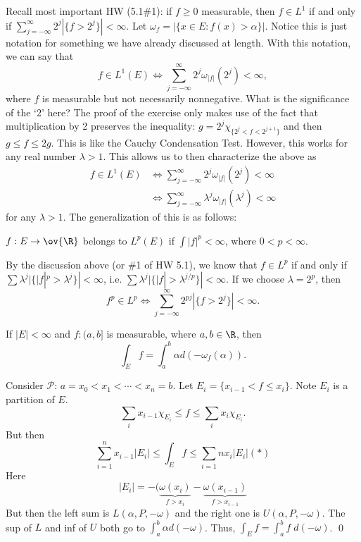 Recall most important HW (5.1\#1): if $f \geq 0$ measurable, then $f \in L^1$ if and only if $\sum_{j= -\infty}^\infty 2^j |\{ f>2^j\}| < \infty$.  Let $\omega_f= |\{ x \in E \colon f(x)>\alpha\}|$. Notice this is just notation for something we have already discussed at length. With this notation, we can say that
	\[
	f \in L^1(E) \Longleftrightarrow \sum_{j= -\infty}^\infty 2^j \omega_{|f|}(2^j)< \infty,
	\]
where $f$ is measurable but not necessarily nonnegative. What is the significance of the `2' here? The proof of the exercise only makes use of the fact that multiplication by 2 preserves the inequality: $g= 2^j \chi_{\{2^j<f<2^{j+1}\}}$ and then $g \leq f \leq 2g$. This is like the Cauchy Condensation Test. However, this works for any real number $\lambda>1$. This allows us to then characterize the above as 
	\[
	\begin{split}
	f \in L^1(E) &\Longleftrightarrow \sum_{j= -\infty}^\infty 2^j \omega_{|f|}(2^j)< \infty \\
	&\Longleftrightarrow \sum_{j= -\infty}^\infty \lambda^j \omega_{|f|}(\lambda^j)< \infty 
	\end{split}
	\]
for any $\lambda>1$. The generalization of this is as follows:

\begin{dfn}[$L^p$]
 $f: E \to \ov{\R}$ belongs to $L^p(E)$ if $\int |f|^p<\infty$, where $0<p<\infty$. 
\end{dfn}


By the discussion above (or \#1 of HW 5.1), we know that $f \in L^p$ if and only if $\sum \lambda^j |\{ |f|^p>\lambda^j \}|<\infty$, i.e. $\sum \lambda^j |\{ |f|> \lambda^{j/p} \}|<\infty$. If we choose $\lambda= 2^p$, then
	\[
	f^p \in L^p \Longleftrightarrow \sum_{j= -\infty}^\infty 2^{pj} |\{ f>2^j \}| < \infty. 
	\]



\begin{thm}
If $|E|<\infty$ and $f: (a,b]$ is measurable, where $a,b \in \R$, then 
	\[
	\int_E f = \int_a^b \alpha d(-\omega_f(\alpha)).
	\]
\end{thm}

\pf Consider $\mathcal{P}$: $a=x_0<x_1<\cdots<x_n=b$. Let $E_i= \{x_{i-1}< f \leq x_i \}$. Note $E_i$ is a partition of $E$.
	\[
	\sum_i x_{i-1} \chi_{E_i} \leq f \leq \sum_i x_i\chi_{E_i}.
	\]
But then 
	\[
	\sum_{i=1}^n x_{i-1} |E_i| \leq \int_E f \leq \sum_{i=1}n x_i |E_i| (*)
	\]
Here 
	\[
	|E_i|= -(\underbrace{\omega(x_i)}_{f>x_i} - \underbrace{\omega(x_{i-1})}_{f>x_{i-1}}
	\]
But then the left sum is $L(\alpha,P,-\omega)$ and the right one is $U(\alpha,P,-\omega)$. The sup of $L$ and inf of $U$ both go to $\int_a^b \alpha d(-\omega)$. Thus, $\int_E f = \int_a^b f \; d(-\omega)$. \qed \\


